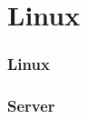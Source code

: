 \section{Linux}

\begin{frame}
    \frametitle{Linux}

    \centering
    
    
\end{frame}

\begin{frame}
    \frametitle{Server}

    \centering
    
    
\end{frame}